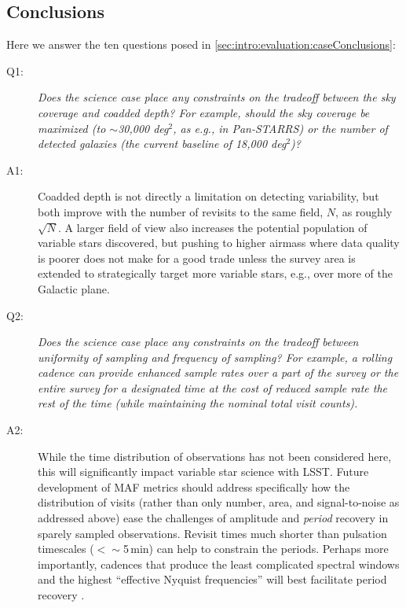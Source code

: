 
 \subsection{Conclusions}

 Here we answer the ten questions posed in
 \autoref{sec:intro:evaluation:caseConclusions}:

 \begin{description}

 \item[Q1:] {\it Does the science case place any constraints on the
 tradeoff between the sky coverage and coadded depth? For example, should
 the sky coverage be maximized (to $\sim$30,000 deg$^2$, as e.g., in
 Pan-STARRS) or the number of detected galaxies (the current baseline 
 of 18,000 deg$^2$)?}

 \item[A1:] Coadded depth is not directly a limitation on detecting variability,
 but both improve with the number of revisits to the same field, $N$,
 as roughly $\sqrt{N}$.  A larger field of view also increases the potential population
 of variable stars discovered, but pushing to higher airmass where data quality is
 poorer does not make for a good trade unless the survey area is extended to strategically
 target more variable stars, e.g., over more of the Galactic plane.

 \item[Q2:] {\it Does the science case place any constraints on the
 tradeoff between uniformity of sampling and frequency of  sampling? For
 example, a rolling cadence can provide enhanced sample rates over a part
 of the survey or the entire survey for a designated time at the cost of
 reduced sample rate the rest of the time (while maintaining the nominal
 total visit counts).}

 \item[A2:] While the time distribution of observations has not been considered
 here, this will significantly impact variable star science with LSST.
 Future development of MAF metrics should address specifically how
 the distribution of visits (rather than only number, area, and signal-to-noise as addressed
 above) ease the challenges of amplitude and \emph{period} recovery in sparely sampled
 observations.  Revisit times much shorter than pulsation timescales ($< \sim$5\,min)
 can help to constrain the periods.  Perhaps more importantly, cadences that
 produce the least complicated spectral windows and the highest
 ``effective Nyquist frequencies'' will best facilitate period recovery \citep[e.g.,][]{1999A&AS..135....1E}.


\end{description}
